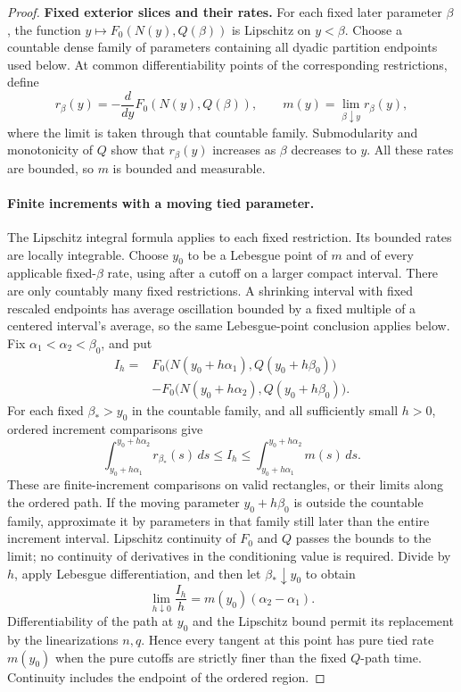 \begin{proof}
\textbf{Fixed exterior slices and their rates.}
For each fixed later parameter $\beta$, the function
$y\mapsto F_0(N(y),Q(\beta))$ is Lipschitz on $y<\beta$.
Choose a countable dense family of parameters containing all
dyadic partition endpoints used below.  At common
differentiability points of the corresponding restrictions, define
\[
r_\beta(y)=-\frac{d}{dy}F_0(N(y),Q(\beta)),\qquad
m(y)=\lim_{\beta\downarrow y}r_\beta(y),
\]
where the limit is taken through that countable family.
Submodularity and monotonicity of $Q$ show that $r_\beta(y)$
increases as $\beta$ decreases to $y$.  All these rates are
bounded, so $m$ is bounded and measurable.

\paragraph{Finite increments with a moving tied parameter.}
The Lipschitz integral formula
\cite[Theorem~3.3]{Heinonen2005Lipschitz} applies to each fixed
restriction.  Its bounded rates are locally integrable.  Choose
$y_0$ to be a Lebesgue point of $m$ and of every applicable
fixed-$\beta$ rate, using \cite[Theorem~1.6.19]{Tao2011Measure}
after a cutoff on a larger compact interval.  There are only
countably many fixed restrictions.  A shrinking interval with fixed
rescaled endpoints has average oscillation bounded by a fixed
multiple of a centered interval's average, so the same Lebesgue-point
conclusion applies below.  Fix
$\alpha_1<\alpha_2<\beta_0$, and put
\begin{align*}
I_h={}&F_0\bigl(N(y_0+h\alpha_1),Q(y_0+h\beta_0)\bigr)\\
&-F_0\bigl(N(y_0+h\alpha_2),Q(y_0+h\beta_0)\bigr).
\end{align*}
For each fixed $\beta_*>y_0$ in the countable family, and all
sufficiently small $h>0$, ordered increment comparisons give
\[
\int_{y_0+h\alpha_1}^{y_0+h\alpha_2}r_{\beta_*}(s)\,ds
\leq I_h\leq
\int_{y_0+h\alpha_1}^{y_0+h\alpha_2}m(s)\,ds.
\]
These are finite-increment comparisons on valid rectangles,
or their limits along the ordered path.  If the moving parameter
$y_0+h\beta_0$ is outside the countable family, approximate it
by parameters in that family still later than the entire
increment interval.  Lipschitz continuity of $F_0$ and $Q$
passes the bounds to the limit; no continuity of derivatives
in the conditioning value is required.  Divide by $h$, apply
Lebesgue differentiation, and then let $\beta_*\downarrow y_0$ to obtain
\[
\lim_{h\downarrow0}\frac{I_h}{h}
=m(y_0)(\alpha_2-\alpha_1).
\]
Differentiability of the path at $y_0$ and the Lipschitz bound
permit its replacement by the linearizations $n,q$.  Hence
every tangent at this point has pure tied rate $m(y_0)$ when
the pure cutoffs are strictly finer than the fixed $Q$-path
time.  Continuity includes the endpoint of the ordered region.


\end{proof}
